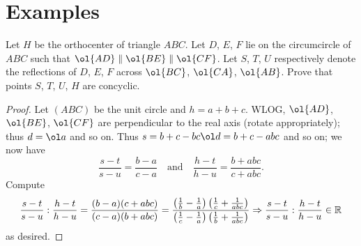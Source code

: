 \documentclass[11pt]{scrartcl}
\begin{document}
\section{Examples}
\begin{example}
  [MOP 2006]
  Let $H$ be the orthocenter of triangle $ABC$.
  Let $D$, $E$, $F$ lie on the circumcircle of $ABC$ such that $\ol{AD} \parallel \ol{BE} \parallel \ol{CF}$.
  Let $S$, $T$, $U$ respectively denote the reflections of $D$, $E$, $F$ across $\ol{BC}$, $\ol{CA}$,
  $\ol{AB}$.
  Prove that points $S$, $T$, $U$, $H$ are concyclic.
\end{example}
\begin{proof}
  Let $(ABC)$ be the unit circle and $h = a+b+c$.
  WLOG, $\ol{AD}$, $\ol{BE}$,  $\ol{CF}$ are perpendicular to the real axis (rotate appropriately);
  thus $d = \ol a$ and so on.
  Thus $s = b+c - bc \ol d = b+c-abc$ and so on; we now have
  \[ \frac{s-t}{s-u}=\frac{b-a}{c-a}\quad\text{and}\quad\frac{h-t}{h-u}=\frac{b+abc}{c+abc}. \]
  Compute \[ \frac{s-t}{s-u} : \frac{h-t}{h-u} = \frac{(b-a)(c+abc)}{(c-a)(b+abc)}
    = \frac{\left(\frac{1}{b}-\frac{1}{a}\right)\left(\frac{1}{c}+\frac{1}{abc}\right)}{\left(\frac{1}{c}-\frac{1}{a}\right)\left(\frac{1}{b}+\frac{1}{abc}\right)}
    \Rightarrow \frac{s-t}{s-u}:\frac{h-t}{h-u} \in \mathbb R \]
  as desired.
\end{proof}
\end{document}

